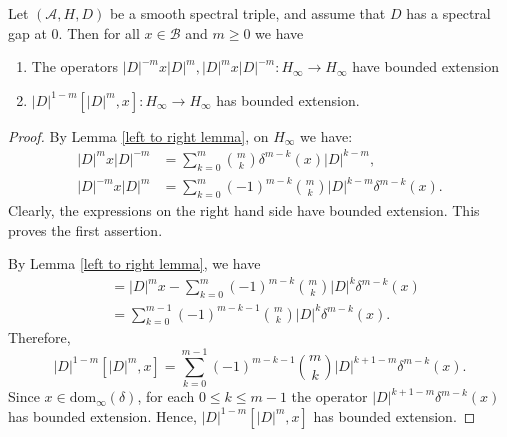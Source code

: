     \begin{lem}\label{left to right corollary} 
        Let $(\mathcal{A},H,D)$ be a smooth spectral triple, and assume that $D$ has a spectral gap at $0.$ Then for all $x \in \mathcal{B}$ and $m\geq 0$ we have
        \begin{enumerate}[{\rm (i)}]
            \item\label{left to right 1} The operators $|D|^{-m}x|D|^m,|D|^mx|D|^{-m}:H_\infty\to H_\infty$ have bounded extension
            \item\label{left to right 2} $|D|^{1-m}[|D|^m,x]:H_\infty\to H_\infty$ has bounded extension.
        \end{enumerate}
    \end{lem}
    \begin{proof} 
        By Lemma \ref{left to right lemma}, on $H_\infty$ we have:
        \begin{align*}
            |D|^mx|D|^{-m} &= \sum_{k=0}^m\binom{m}{k}\delta^{m-k}(x)|D|^{k-m},\\
            |D|^{-m}x|D|^m &= \sum_{k=0}^m(-1)^{m-k}\binom{m}{k}|D|^{k-m}\delta^{m-k}(x).  
        \end{align*}
        Clearly, the expressions on the right hand side have bounded extension. This proves the first assertion.

        By Lemma \ref{left to right lemma}, we have
        \begin{align*}
            [|D|^m,x] &= |D|^mx-\sum_{k=0}^m(-1)^{m-k}\binom{m}{k}|D|^k\delta^{m-k}(x)\\
                      &= \sum_{k=0}^{m-1}(-1)^{m-k-1}\binom{m}{k}|D|^k\delta^{m-k}(x).
        \end{align*}
        Therefore,
        $$|D|^{1-m}[|D|^m,x]=\sum_{k=0}^{m-1}(-1)^{m-k-1}\binom{m}{k}|D|^{k+1-m}\delta^{m-k}(x).$$
        Since $x \in \mathrm{dom}_\infty(\delta)$, for each $0 \leq k \leq m-1$ the operator $|D|^{k+1-m}\delta^{m-k}(x)$ has bounded extension. Hence, $|D|^{1-m}[|D|^m,x]$
        has bounded extension.
    \end{proof}
    
